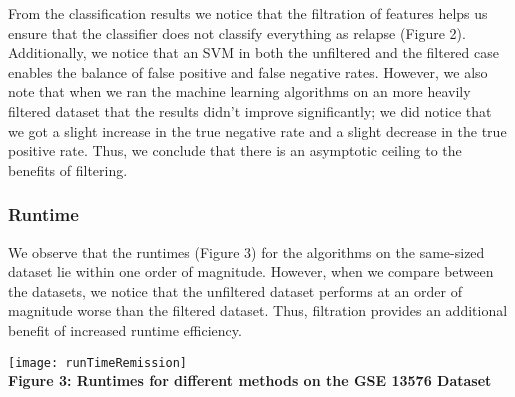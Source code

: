 \documentclass[12pt]{scrartcl}
\begin{document}
    From the classification results we notice that the filtration of features helps us ensure that the classifier does not classify everything as relapse (Figure 2). Additionally, we notice that an SVM in both the unfiltered and the filtered case enables the balance of false positive and false negative rates. However, we also note that when we ran the machine learning algorithms on an  more heavily filtered dataset that the results didn't improve significantly; we did notice that we got a slight increase in the true negative rate and a slight decrease in the true positive rate. Thus, we conclude that there is an asymptotic ceiling to the benefits of filtering. 
   
    \subsubsection{Runtime}
    We observe that the runtimes (Figure 3) for the algorithms on the same-sized dataset lie within one order of magnitude. However, when we compare between the datasets, we notice that the unfiltered dataset performs at  an order of magnitude worse than the filtered dataset. Thus, filtration provides an additional benefit of increased runtime efficiency.
    
    \begin{center}
    \texttt{[image: runTimeRemission]}\\
    \textbf{Figure 3: Runtimes for different methods on the GSE 13576 Dataset}
    \end{center}
    
    
    
\end{document}
